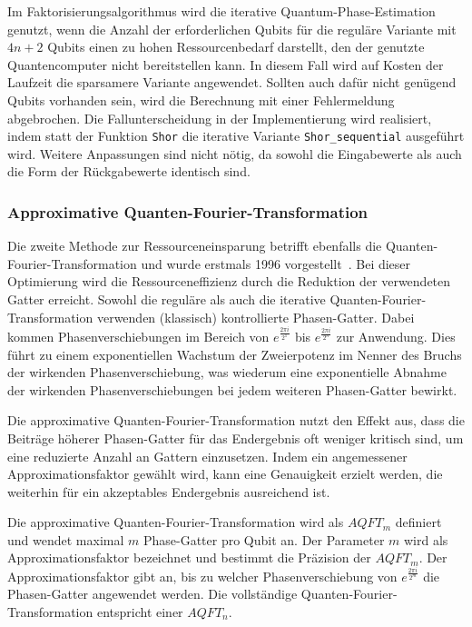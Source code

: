 \bigskip

Im Faktorisierungsalgorithmus wird die iterative Quantum-Phase-Estimation genutzt, 
wenn die Anzahl der erforderlichen Qubits für die reguläre Variante mit \(4n+2\) Qubits einen zu hohen Ressourcenbedarf darstellt, 
den der genutzte Quantencomputer nicht bereitstellen kann. 
In diesem Fall wird auf Kosten der Laufzeit die sparsamere Variante angewendet. 
Sollten auch dafür nicht genügend Qubits vorhanden sein, 
wird die Berechnung mit einer Fehlermeldung abgebrochen. 
Die Fallunterscheidung in der Implementierung wird realisiert, 
indem statt der Funktion \texttt{Shor} die iterative Variante \texttt{Shor_sequential} ausgeführt wird. 
Weitere Anpassungen sind nicht nötig, 
da sowohl die Eingabewerte als auch die Form der Rückgabewerte identisch sind.

\subsubsection{Approximative Quanten-Fourier-Transformation} \label{sec:ApproxQFT}
Die zweite Methode zur Ressourceneinsparung betrifft ebenfalls die Quanten-Fourier-Transformation und 
wurde erstmals 1996 vorgestellt~\cite{Barenco_1996}.
Bei dieser Optimierung wird die Ressourceneffizienz durch die Reduktion der verwendeten Gatter erreicht. 
Sowohl die reguläre als auch die iterative Quanten-Fourier-Transformation verwenden (klassisch) kontrollierte Phasen-Gatter.
Dabei kommen Phasenverschiebungen im Bereich von \(e^{\frac{2\pi i}{2^1}}\) bis \(e^{\frac{2\pi i}{2^n}}\) zur Anwendung. 
Dies führt zu einem exponentiellen Wachstum der Zweierpotenz im Nenner des Bruchs der wirkenden Phasenverschiebung, 
was wiederum eine exponentielle Abnahme der wirkenden Phasenverschiebungen bei jedem weiteren Phasen-Gatter bewirkt. 

Die approximative Quanten-Fourier-Transformation nutzt den Effekt aus, 
dass die Beiträge höherer Phasen-Gatter für das Endergebnis oft weniger kritisch sind, 
um eine reduzierte Anzahl an Gattern einzusetzen. 
Indem ein angemessener Approximationsfaktor gewählt wird, 
kann eine Genauigkeit erzielt werden, 
die weiterhin für ein akzeptables Endergebnis ausreichend ist.

Die approximative Quanten-Fourier-Transformation wird als \(AQFT_m\) definiert und 
wendet maximal \(m\) Phase-Gatter pro Qubit an. 
Der Parameter \(m\) wird als Approximationsfaktor bezeichnet und bestimmt die Präzision der \(AQFT_m\). 
Der Approximationsfaktor gibt an, 
bis zu welcher Phasenverschiebung von \(e^{\frac{2\pi i}{2^m}}\) die Phasen-Gatter angewendet werden.
Die vollständige Quanten-Fourier-Transformation entspricht einer \(AQFT_n\).

